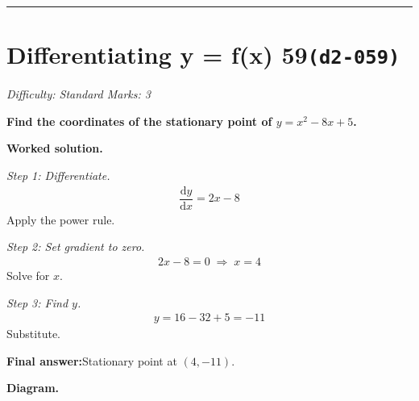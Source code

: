 \documentclass[11pt]{article}
\newcommand{\question}[1]{\par\medskip\noindent\textbf{#1}\par}
\begin{document}
\medskip\hrule

\section*{Differentiating y = f(x) 59\quad\small\texttt{(d2-059)}}
\textit{Difficulty: Standard \quad\textbar\quad Marks: 3}

\question{Find the coordinates of the stationary point of \( y = x^2 - 8x + 5 \).}

\textbf{Worked solution.}

\textit{Step 1: Differentiate.}
\[\begin{gathered}
\dfrac{\mathrm{d}y}{\mathrm{d}x} = 2x - 8
\end{gathered}\]
Apply the power rule.

\textit{Step 2: Set gradient to zero.}
\[\begin{gathered}
2x - 8 = 0 \;\Rightarrow\; x = 4
\end{gathered}\]
Solve for \( x \).

\textit{Step 3: Find \( y \).}
\[\begin{gathered}
y = 16 - 32 + 5 = -11
\end{gathered}\]
Substitute.

\begin{answerbox}
\textbf{Final answer:}\quad Stationary point at \(\displaystyle  (4, -11) \).
\end{answerbox}
\textbf{Diagram.}
\end{document}
